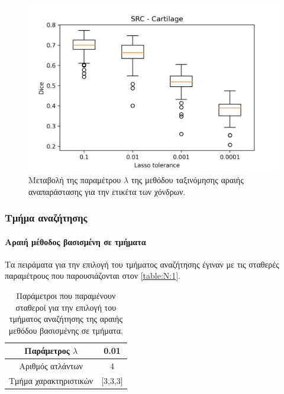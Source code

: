 \documentclass[a4paper,12pt]{article}
\newcommand{\paragraphLine}[1]{\paragraph{#1}\mbox{}}
\begin{document}
\begin{figure}[H]
    \centering
    \includegraphics[width=0.85\linewidth]{SRC_Lasso_tolerance_Cartilage_plot.png}
    \caption{Μεταβολή της παραμέτρου $\lambda$ της μεθόδου ταξινόμησης αραιής
             αναπαράστασης για την ετικέτα των χόνδρων.}
    \label{fig:SRC:lambda:3}
\end{figure}


\subsubsection{Τμήμα αναζήτησης}

\paragraphLine{Αραιή μέθοδος βασισμένη σε τμήματα}

Τα πειράματα για την επιλογή του τμήματος αναζήτησης έγιναν με τις σταθερές
παραμέτρους που παρουσιάζονται στον \autoref{table:N:1}.

\begin{table}[h!]
    \centering
    \begin{tabular}{|c|c|} 
        \hline
        Παράμετρος $\lambda$ & 0.01 \\ 
        \hline
        Αριθμός ατλάντων & 4 \\ 
        \hline
        Τμήμα χαρακτηριστικών & [3,3,3] \\ 
        \hline
    \end{tabular}
    \caption{Παράμετροι που παραμένουν σταθεροί για την επιλογή του τμήματος
             αναζήτησης της αραιής μεθόδου βασισμένης σε τμήματα.}
    \label{table:N:1}
\end{table}
\end{document}
